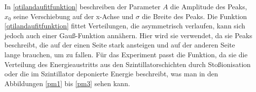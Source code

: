             In \ref{qtilandaufitfunktion} beschreiben der Parameter $A$ die Amplitude des Peaks, $x_0$ seine Verschiebung auf der x-Achse und $\sigma$ die Breite des Peaks. 
            Die Funktion \ref{qtilandaufitfunktion} fittet Verteilungen, die asymmetrisch verlaufen, kann sich jedoch auch einer Gauß-Funktion annähern.  Hier wird sie verwendet, da sie Peaks beschreibt, die auf der einen Seite stark ansteigen und auf der anderen Seite lange brauchen, um zu fallen. 
            Für das Experiment passt die Funktion, da sie die Verteilung des Energieaustritts aus den Szintillatorschichten durch Stoßionisation oder die im Szintillator deponierte Energie beschreibt, was man in den Abbildungen \ref{pm1} bis \ref{pm3} sehen kann.
                \begin{figure}[htbp]

\end{figure}
